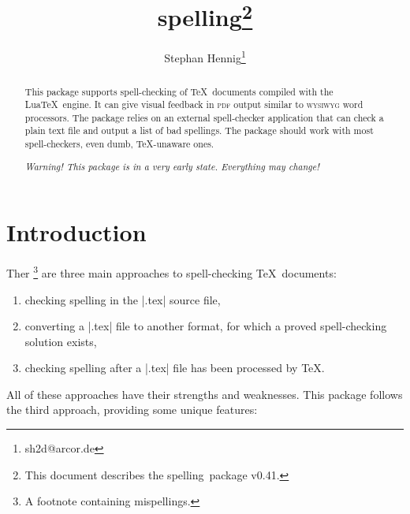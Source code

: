 \documentclass[11pt]{article}
\newcommand*{\pkg}{\textsf{spelling}}
\newcommand*{\acr}[1]{\mbox{\scshape#1}}
\begin{document}
\author{Stephan Hennig\thanks{sh2d@arcor.de}}
\title{\pkg\thanks{This document describes the \pkg\ package v0.41.}}
\maketitle


\begin{abstract}
  This package supports spell-checking of \TeX\ documents compiled with
  the Lua\TeX\ engine.  It can give visual feedback in \acr{pdf} output
  similar to \acr{wysiwyg} word processors.  The package relies on an
  external spell-checker application that can check a plain text file
  and output a list of bad spellings.  The package should work with most
  spell-checkers, even dumb, \TeX-unaware ones.

  \emph{Warning!  This package is in a very early state.  Everything may
    change!}
\end{abstract}

\begin{multicols}{2}
\small
\makeatletter
\renewcommand{\@tocrmarg}{2.55em plus1fil}
\makeatother
\tableofcontents
\end{multicols}


\section{Introduction}
\label{sec:intro}

Ther%
\footnote{A footnote containing mispellings.}
%
are three main approaches to spell-checking \TeX\ documents:

\begin{enumerate}

\item checking spelling in the |.tex| source file,

\item converting a |.tex| file to another format, for which a proved
  spell-checking solution exists,

\item checking spelling after a |.tex| file has been processed by \TeX.

\end{enumerate}

All of these approaches have their strengths and weaknesses.  This
package follows the third approach, providing some unique features:
\end{document}
